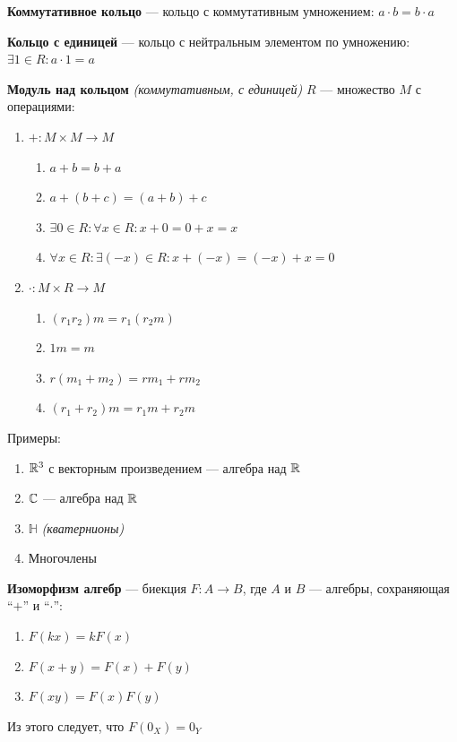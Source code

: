 \textbf{Коммутативное кольцо} --- кольцо с коммутативным умножением: $a\cdot b = b\cdot a$

\textbf{Кольцо с единицей} --- кольцо с нейтральным элементом по умножению: $\exists 1\in R : a\cdot 1 = a$

\textbf{Модуль над кольцом} \textit{(коммутативным, с единицей)} $R$ --- множество $M$ с операциями:
\begin{enumerate}
    \item $+:M\times M\to M$ \begin{enumerate}
              \item $a+b=b+a$
              \item $a+(b+c)=(a+b)+c$
              \item $\exists 0\in R : \forall x\in R : x + 0 = 0 + x = x$
              \item $\forall x\in R : \exists (-x)\in R : x + (-x) = (-x) + x = 0$
          \end{enumerate}
    \item $\cdot : M\times R\to M$ \begin{enumerate}
              \item $(r_1r_2)m=r_1(r_2m)$
              \item $1m=m$
              \item $r(m_1+m_2)=rm_1+rm_2$
              \item $(r_1+r_2)m=r_1m+r_2m$
          \end{enumerate}
\end{enumerate}

Примеры:
\begin{enumerate}
    \item $\mathbb{R}^3$ с векторным произведением --- алгебра над $\mathbb{R}$
    \item $\mathbb{C}$ --- алгебра над $\mathbb{R}$
    \item $\mathbb H$ \textit{(кватернионы)}
    \item Многочлены
\end{enumerate}

\textbf{Изоморфизм алгебр} --- биекция $F : A\to B$, где $A$ и $B$ --- алгебры, сохраняющая ``$+$'' и ``$\cdot$'':
\begin{enumerate}
    \item $F(kx)=kF(x)$
    \item $F(x + y) = F(x) + F(y)$
    \item $F(xy) = F(x)F(y)$
\end{enumerate}

Из этого следует, что $F(0_X)=0_Y$

